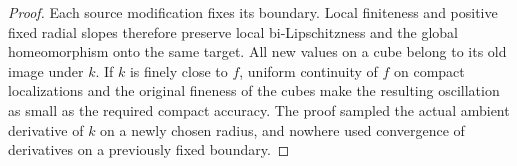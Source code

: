 \begin{proof}
Each source modification fixes its boundary.  Local finiteness and
positive fixed radial slopes therefore preserve local
bi-Lipschitzness and the global homeomorphism onto the same target.
All new values on a cube belong to its old image under $k$.  If
$k$ is finely close to $f$, uniform continuity of $f$ on compact
localizations and the original fineness of the cubes make the
resulting oscillation as small as the required compact accuracy.
The proof sampled the actual ambient derivative of $k$ on a newly
chosen radius, and nowhere used convergence of derivatives on a
previously fixed boundary.
\end{proof}
